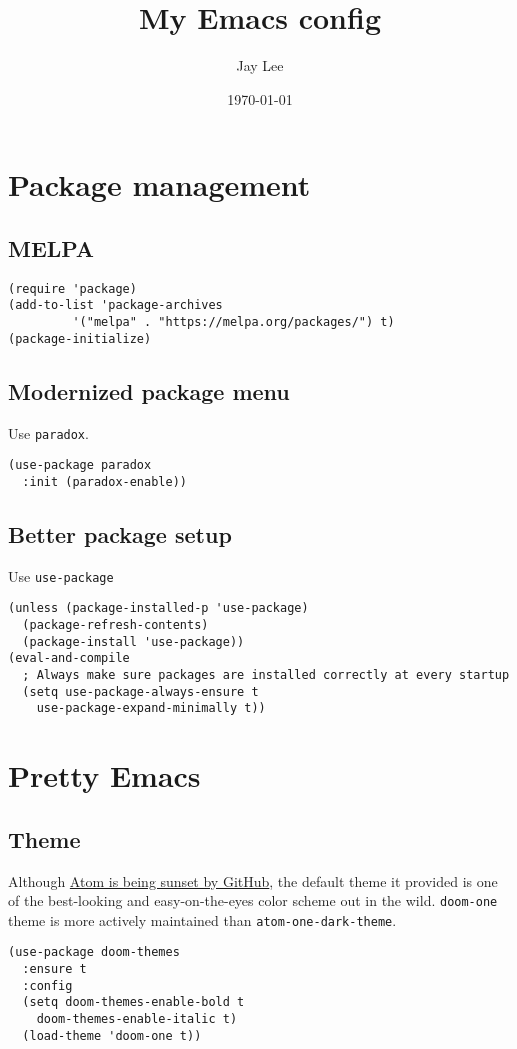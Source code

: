 \documentclass[a4paper,11pt]{article}
\author{Jay Lee}
\date{\today}
\title{My Emacs config}
\begin{document}
\maketitle
\tableofcontents


\section{Package management}
\label{sec:org5af9158}
\subsection{MELPA}
\label{sec:org2cfa207}
\begin{verbatim}
(require 'package)
(add-to-list 'package-archives
	     '("melpa" . "https://melpa.org/packages/") t)
(package-initialize)
\end{verbatim}

\subsection{Modernized package menu}
\label{sec:orgc3cccb9}
Use \texttt{paradox}.
\begin{verbatim}
(use-package paradox
  :init (paradox-enable))
\end{verbatim}

\subsection{Better package setup}
\label{sec:orgfa34a71}
Use \texttt{use-package}
\begin{verbatim}
(unless (package-installed-p 'use-package)
  (package-refresh-contents)
  (package-install 'use-package))
(eval-and-compile
  ; Always make sure packages are installed correctly at every startup
  (setq use-package-always-ensure t
	use-package-expand-minimally t))
\end{verbatim}

\section{Pretty Emacs}
\label{sec:org4adcc39}
\subsection{Theme}
\label{sec:orge775cd7}
Although \href{https://github.blog/2022-06-08-sunsetting-atom/}{Atom is being sunset by GitHub}, the default theme it provided is one of the best-looking and easy-on-the-eyes color scheme out in the wild.
\texttt{doom-one} theme is more actively maintained than \texttt{atom-one-dark-theme}.
\begin{verbatim}
(use-package doom-themes
  :ensure t
  :config
  (setq doom-themes-enable-bold t
	doom-themes-enable-italic t)
  (load-theme 'doom-one t))
\end{verbatim}
\end{document}
